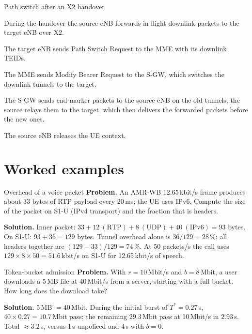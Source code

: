 \documentclass[11pt,a4paper]{article}
\begin{document}
\begin{acnfigure}
  \caption{Network-triggered service request with S-GW buffering (\cref{proc:ddn}).}
  \label{fig:ddn}
\end{acnfigure}

\begin{procedurebox}{Path switch after an X2 handover}\label{proc:switch}
\begin{steps}
  \item During the handover the source eNB forwards in-flight downlink packets to the target eNB over X2.
  \item The target eNB sends Path Switch Request to the MME with its downlink TEIDs.
  \item The MME sends Modify Bearer Request to the S-GW, which switches the downlink tunnels to the target.
  \item The S-GW sends end-marker packets to the source eNB on the old tunnels; the source relays them to
        the target, which then delivers the forwarded packets before the new ones.
  \item The source eNB releases the UE context.
\end{steps}
\end{procedurebox}

\section{Worked examples}

\begin{examplebox}{Overhead of a voice packet}\label{ex:volte}
\textbf{Problem.} An AMR-WB 12.65\,kbit/s frame produces about 33 bytes of RTP payload every 20\,ms; the UE
uses IPv6. Compute the size of the packet on S1-U (IPv4 transport) and the fraction that is headers.

\textbf{Solution.} Inner packet: $33 + 12\ (\mathrm{RTP}) + 8\ (\mathrm{UDP}) + 40\ (\mathrm{IPv6}) = 93$ bytes. On S1-U:
$93 + 36 = 129$ bytes. Tunnel overhead alone is $36/129 = 28\,\%$; all headers together are
$(129-33)/129 = 74\,\%$. At 50 packets/s the call uses $129\times8\times50 = 51.6$\,kbit/s on S1-U for 12.65\,kbit/s of
speech.
\end{examplebox}

\begin{examplebox}{Token-bucket admission}\label{ex:tb}
\textbf{Problem.} With $r = 10$\,Mbit/s and $b = 8$\,Mbit, a user downloads a 5\,MB file at 40\,Mbit/s from a
server, starting with a full bucket. How long does the download take?

\textbf{Solution.} $5$\,MB $= 40$\,Mbit. During the initial burst of $T^\ast = 0.27$\,s, $40\times0.27 = 10.7$\,Mbit pass;
the remaining $29.3$\,Mbit pass at 10\,Mbit/s in $2.93$\,s. Total $\approx 3.2$\,s, versus 1\,s unpoliced and 4\,s
with $b = 0$.
\end{examplebox}
\end{document}
